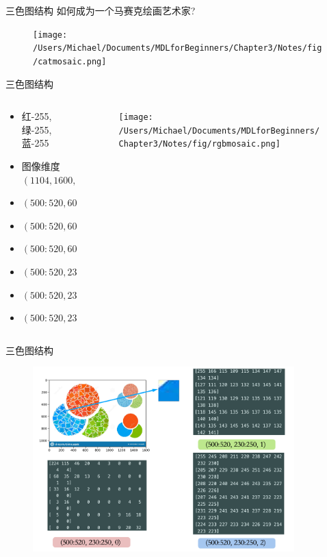 \documentclass[handout]{beamer}
\begin{document}
\begin{frame}{三色图结构}
	如何成为一个马赛克绘画艺术家?
	\begin{figure}[H]
		\centering
		\texttt{[image: /Users/Michael/Documents/MDLforBeginners/Chapter3/Notes/fig/catmosaic.png]}
	\end{figure}
\end{frame}

\begin{frame}{三色图结构}
\begin{columns}
	\begin{column}{0.35\textwidth}
		\begin{itemize}
			\item \footnotesize{红-255, 绿-255, 蓝-255}
			\item \footnotesize{图像维度 $(1104, 1600, 3)$}
			\item $(500:520, 600:620, 0)$
			\item $(500:520, 600:620, 1)$
			\item $(500:520, 600:620, 2)$
			\item $(500:520, 230:250, 0)$
			\item $(500:520, 230:250, 1)$
			\item $(500:520, 230:250, 2)$
		\end{itemize}
	\end{column}
	\begin{column}{0.65\textwidth}
		\begin{figure}[H]
	\texttt{[image: /Users/Michael/Documents/MDLforBeginners/Chapter3/Notes/fig/rgbmosaic.png]}
\end{figure}	
	\end{column}
\end{columns}
\end{frame}

\begin{frame}{三色图结构}
\begin{figure}[H]
	\centering
	\includegraphics[width=0.9\textwidth]{fig/rgbdecomposition}
\end{figure}
\end{frame}
\end{document}
